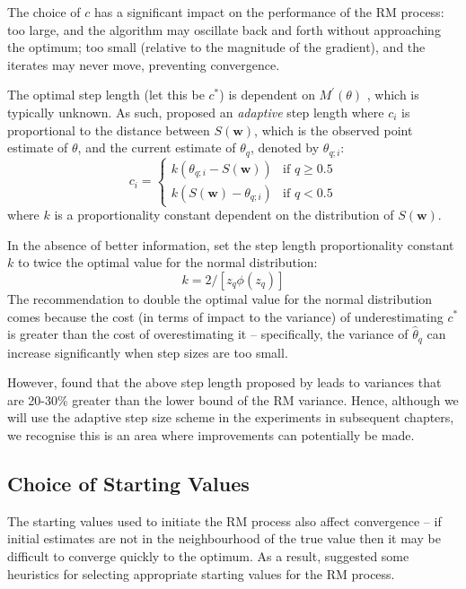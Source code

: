 The choice of $c$ has a significant impact on the performance of the RM process: too large, and the algorithm may oscillate back and forth without approaching the optimum; too small (relative to the magnitude of the gradient), and the iterates may never move, preventing convergence.

The optimal step length (let this be $c^*$) is dependent on $M^\prime(\theta)$ \cite{LlyodBotev2015}, which is typically unknown. As such, \citet{Garthwaite1992} proposed an \textit{adaptive} step length where $c_i$ is proportional to the distance between $S(\bm{w})$, which is the observed point estimate of $\theta$, and the current estimate of $\theta_q$, denoted by $\theta_{q; i}$:\begin{equation} c_i = \begin{cases}
    k\left(\theta_{q; i} - S(\bm{w}) \right) &\text{if $q \geq 0.5$} \\
    k\left(S(\bm{w}) - \theta_{q; i}\right) &\text{if $q < 0.5$}
\end{cases}
\end{equation}
where $k$ is a proportionality constant dependent on the distribution of $S(\bm{w})$.

In the absence of better information, \citet{Garthwaite1992} set the step length proportionality constant $k$ to twice the optimal value for the normal distribution: \[
k = 2/\left[z_q \phi(z_q) \right]
\]
The recommendation to double the optimal value for the normal distribution comes because the cost (in terms of impact to the variance) of underestimating $c^*$ is greater than the cost of overestimating it -- specifically, the variance of $\hat\theta_q$ can increase significantly when step sizes are too small.

However, \citet{LlyodBotev2015} found that the above step length proposed by \citet{Garthwaite1992} leads to variances that are 20-30\% greater than the lower bound of the RM variance. Hence, although we will use the adaptive step size scheme in the experiments in subsequent chapters, we recognise this is an area where improvements can potentially be made.

\subsection{Choice of Starting Values}

The starting values used to initiate the RM process also affect convergence -- if initial estimates are not in the neighbourhood of the true value then it may be difficult to converge quickly to the optimum. As a result, \citet{Garthwaite1992} suggested some heuristics for selecting appropriate starting values for the RM process.


